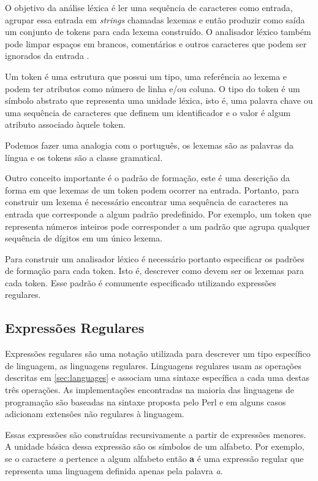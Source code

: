 O objetivo da análise léxica é ler uma sequência de caracteres como entrada, agrupar essa entrada em 
\textit{strings} chamadas lexemas e então produzir como saída um conjunto de 
tokens para cada lexema construído. O analisador léxico também pode limpar espaços 
em brancos, comentários e outros caracteres que podem ser ignorados da entrada \cite{aho2006}.

Um token é uma estrutura que possui um tipo, uma referência ao lexema e podem ter atributos como número de linha 
e/ou coluna.
O tipo do token é um símbolo abstrato que representa uma unidade léxica, isto é, uma  palavra chave ou
uma sequência de caracteres que definem um identificador e o valor é algum atributo associado àquele token.

Podemos fazer uma analogia com o português, os lexemas são as palavras da língua e os tokens são
a classe gramatical.

Outro conceito importante é o padrão de formação, este é uma descrição da forma em que lexemas de
um token podem ocorrer na entrada. Portanto, para construir um lexema é necessário 
encontrar uma sequência de caracteres na entrada que corresponde a algum padrão predefinido.
Por exemplo, um token que representa números inteiros pode corresponder a um padrão que agrupa
qualquer sequência de dígitos em um único lexema.

Para construir um analisador léxico é necessário portanto especificar os padrões de formação para cada token. 
Isto é, descrever como devem ser os lexemas para cada token. Esse padrão é comumente especificado 
utilizando expressões regulares.

\subsection{Expressões Regulares}

Expressões regulares são uma notação utilizada para descrever um tipo específico de linguagem, as linguagens regulares.
Linguagens regulares usam as operações descritas em \ref{sec:languages} e associam uma sintaxe
específica a cada uma destas três operações. As implementações encontradas na maioria das linguagens de programação
são baseadas na sintaxe proposta pelo Perl e em alguns casos adicionam extensões não regulares à
linguagem.

Essas expressões são construídas recursivamente a partir de expressões menores. 
A unidade básica dessa expressão são os símbolos de um alfabeto. Por exemplo,
se o caractere \textit{a} pertence a algum alfabeto então \textbf{a} é 
uma expressão regular que representa uma linguagem definida apenas pela palavra \textit{a}.

